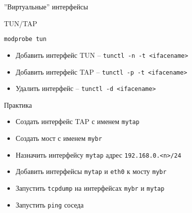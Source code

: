 
\begin{frame}{''Виртуальные'' интерфейсы}
	\begin{block}{TUN/TAP}

		{\tt modprobe tun}

		\begin{itemize}
			\item Добавить интерфейс TUN -- {\tt tunctl -n -t <ifacename>}
			\item Добавить интерфейс TAP -- {\tt tunctl -p -t <ifacename>}
			\item Удалить интерфейс -- {\tt tunctl -d <ifacename>}
		\end{itemize}
	\end{block}

	\pause

	\begin{block}{Практика}
		\begin{itemize}
			\item Создать интерфейс TAP с именем {\tt mytap}
			\item Создать мост с именем {\tt mybr}
			\item Назначить интерфейсу {\tt mytap} адрес {\tt 192.168.0.<n>/24}
			\item Добавить интерфейсы {\tt mytap} и {\tt eth0} к мосту {\tt mybr}
			\item Запустить {\tt tcpdump} на интерфейсах {\tt mybr} и {\tt mytap}
			\item Запустить {\tt ping} соседа
		\end{itemize}
	\end{block}

\end{frame}


